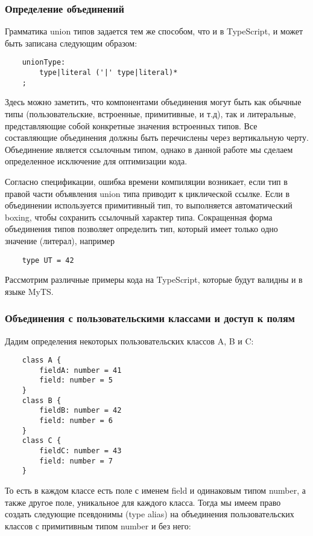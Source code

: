 \subsubsection{Определение объединений}

Грамматика union типов задается тем же способом, что и в TypeScript, и может быть записана следующим образом:

\begin{lstlisting}
    unionType:
        type|literal ('|' type|literal)*
    ;
\end{lstlisting}
Здесь можно заметить, что компонентами объединения могут быть как обычные типы (пользовательские, встроенные,
примитивные, и т.д), так и литеральные, представляющие собой конкретные значения встроенных типов.
Все составляющие объединения должны быть перечислены через вертикальную черту.
Объединение является ссылочным типом, однако в данной работе мы сделаем определенное исключение для оптимизации кода.

Согласно спецификации, ошибка времени компиляции возникает, если тип в правой части объявления union типа приводит к
циклической ссылке.
Если в объединении используется примитивный тип, то выполняется автоматический boxing, чтобы сохранить
ссылочный характер типа.
Сокращенная форма объединения типов позволяет определить тип, который имеет только одно значение (литерал), например

\begin{lstlisting}
    type UT = 42
\end{lstlisting}

Рассмотрим различные примеры кода на TypeScript, которые будут валидны и в языке MyTS.

\subsubsection{Объединения с пользовательскими классами и доступ к полям}

Дадим определения некоторых пользовательских классов A, B и C:

\begin{lstlisting}
    class A {
        fieldA: number = 41
        field: number = 5
    }
    class B {
        fieldB: number = 42
        field: number = 6
    }
    class C {
        fieldC: number = 43
        field: number = 7
    }
\end{lstlisting}
То есть в каждом классе есть поле с именем field и одинаковым типом number, а также другое поле, уникальное для каждого
класса.
Тогда мы имеем право создать следующие псевдонимы (type alias) на объединения пользовательских классов с примитивным типом
number и без него:

